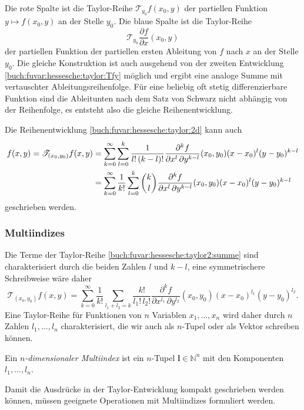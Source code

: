 Die rote Spalte ist die Taylor-Reihe $\mathscr{T}_{y_0} f(x_0,y)$ der
partiellen Funktion $y\mapsto f(x_0,y)$ an der Stelle $y_0$.
Die blaue Spalte ist die Taylor-Reihe
\[
\mathscr{T}_{y_0} \frac{\partial f}{\partial x}(x_0,y)
\]
der partiellen Funktion der partiellen ersten Ableitung von $f$ nach $x$
an der Stelle $y_0$.
Die gleiche Konstruktion ist auch ausgehend von der zweiten Entwicklung
\eqref{buch:fuvar:hessesche:taylor:Tfy} möglich und ergibt eine
analoge Summe mit vertauschter Ableitungsreihenfolge.
Für eine beliebig oft stetig differenzierbare Funktion sind die
Ableitunten nach dem Satz von Schwarz nicht abhängig von der Reihenfolge,
es entsteht also die gleiche Reihenentwicklung.

Die Reihenentwicklung \eqref{buch:fuvar:hessesche:taylor:2d} kann auch
\begin{align}
f(x,y)
=
\mathscr{T}_{(x_0,y_0)}f(x,y)
&=
\sum_{k=0}^\infty
\sum_{l=0}^k
\frac{1}{l!\,(k-l)!}
\frac{\partial^k f}{\partial x^l\,\partial y^{k-l}}(x_0,y_0)
(x-x_0)^l(y-y_0)^{k-l}
\notag
\\
&=
\sum_{k=0}^\infty
\frac{1}{k!}
\sum_{l=0}^k
\binom{k}{l}
\frac{\partial^k f}{\partial x^l\,\partial y^{k-l}}(x_0,y_0)
(x-x_0)^l(y-y_0)^{k-l}
\label{buch:fuvar:hessesche:taylor2:summe}
\end{align}
geschrieben werden.

%
%
%
\subsubsection{Multiindizes}
Die Terme der Taylor-Reihe \eqref{buch:fuvar:hessesche:taylor2:summe}
sind charakterisiert durch die beiden Zahlen $l$ und $k-l$, eine symmetrischere
Schreibweise wäre daher
\[
\mathscr{T}_{(x_0,y_0)}f(x,y)
=
\sum_{k=0}^\infty
\frac{1}{k!}
\sum_{l_1+l_2=k}
\frac{k!}{l_1!\,l_2!}
\frac{\partial^k f}{\partial x^{l_1}\,\partial y^{l_2}}(x_0,y_0)
(x-x_0)^{l_1}(y-y_0)^{l_2}.
\]
Eine Taylor-Reihe für Funktionen von $n$ Variablen $x_1,\dots,x_n$ wird
daher durch $n$ Zahlen $l_1,\dots,l_n$ charakterisiert, die wir auch
als $n$-Tupel oder als Vektor schreiben können.

\begin{definition}[Multiindex]
Ein {\em $n$-dimensionaler Multiindex} ist ein $n$-Tupel
$\mathbf{l}\in\mathbb{N}^n$ mit den Komponenten $l_1,\dots,l_n$.
\end{definition}

Damit die Ausdrücke in der Taylor-Entwicklung kompakt geschrieben werden 
können, müssen geeignete Operationen mit Multiindizes formuliert werden.

